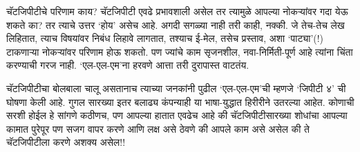 चॅटजिपीटीचे परिणाम काय?
चॅटजिपीटी एवढे प्रभावशाली असेल तर त्यामुळे आपल्या नोकऱ्यांवर गदा येऊ शकते का? तर त्याचे उत्तर `होय' असेच आहे. अगदी सगळ्या नाही तरी काही, नक्की. जे तेच-तेच लेख लिहितात, त्याच विषयांवर निबंध लिहावे लागतात, तश्याच ई-मेल, तसेच प्रस्ताव, अशा `पाट्या'(!)  टाकणाऱ्या नोकऱ्यांवर परिणाम होऊ शकतो. पण ज्यांचे काम सृजनशील, नवा-निर्मिती-पूर्ण आहे त्यांना चिंता करण्याची गरज नाही. `एल-एल-एम'ना हरवणे आत्ता तरी दुरापास्त वाटतंय.

चॅटजिपीटीचा बोलबाला चालू असतानाच त्याच्या जनकांनी पुढील `एल-एल-एम'ची म्हणजे `जिपीटी ४' ची घोषणा केली आहे. गुगल सारख्या इतर बलाढ्य कंपन्याही या भाषा-युद्धात हिरीरीने उतरल्या आहेत. कोणाची सरशी होईल हे सांगणे कठीणच, पण आपल्या हातात एवढेच आहे की चॅटजिपीटीसारख्या शोधांचा आपल्या कामात पुरेपूर पण सजग वापर करणे आणि लक्ष असे ठेवणे की आपले काम असे असेल की ते चॅटजिपीटीला करणे अशक्य असेल!!